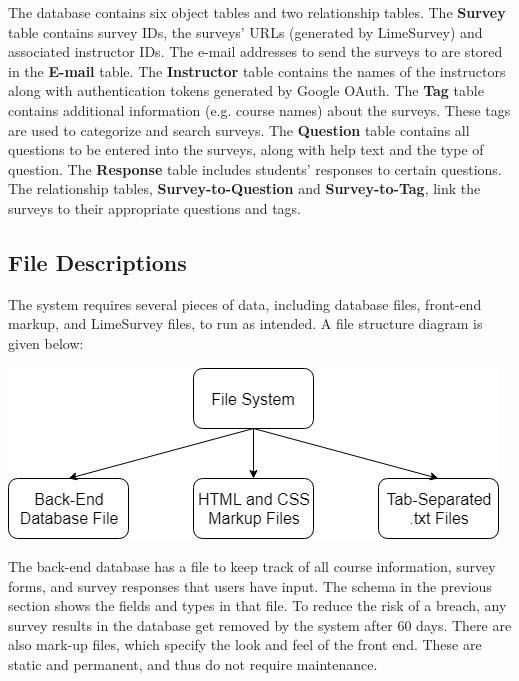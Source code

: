 \documentclass{article}
\begin{document}
\vspace{5mm}

The database contains six object tables and two relationship tables. The \textbf{Survey} table contains survey IDs, the surveys' URLs (generated by LimeSurvey) and associated instructor IDs. The e-mail addresses to send the surveys to are stored in the \textbf{E-mail} table. The \textbf{Instructor} table contains the names of the instructors along with authentication tokens generated by Google OAuth. The \textbf{Tag} table contains additional information (e.g. course names) about the surveys. These tags are used to categorize and search surveys. The \textbf{Question} table contains all questions to be entered into the surveys, along with help text and the type of question. The \textbf{Response} table includes students' responses to certain questions. The relationship tables, \textbf{Survey-to-Question} and \textbf{Survey-to-Tag}, link the surveys to their appropriate questions and tags.

\subsection{File Descriptions}

The system requires several pieces of data, including database files, front-end markup, and LimeSurvey files, to run as intended. A file structure diagram is given below:

\begin{center}
\label{fig:filediagram}
{\includegraphics[scale=.6]{images/file_structure_diagram.png}} 
\end{center}

\vspace{3mm}

The back-end database has a file to keep track of all course information, survey forms, and survey responses that users have input. The schema in the previous section shows the fields and types in that file. To reduce the risk of a breach, any survey results in the database get removed by the system after 60 days. There are also mark-up files, which specify the look and feel of the front end. These are static and permanent, and thus do not require maintenance.
\end{document}
